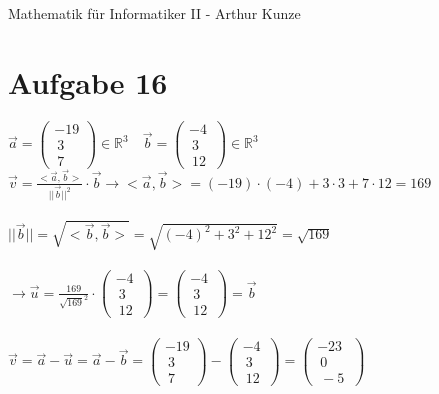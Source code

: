 \documentclass[12pt,a4paper]{article}
\begin{document}
Mathematik für Informatiker II - Arthur Kunze
\section*{Aufgabe 16}
$\vec{a} = \left( \begin{array}{c} -19 \\\ 3 \\\ 7 \ \end{array}\right)\in \mathbb{R}^3 \quad \vec{b} = \left( \begin{array}{c} -4 \\\ 3 \\\ 12 \ \end{array}\right)\in \mathbb{R}^3$\
\\
$\vec{v} = \frac{<\vec{a},\vec{b}>}{||\vec{b}||^2}\cdot \vec{b} \rightarrow <\vec{a},\vec{b}> = (-19)\cdot (-4)+3\cdot 3+7\cdot 12 = 169$\\
\\
$||\vec{b}|| =\sqrt{<\vec{b},\vec{b}>}=\sqrt{(-4)^2+3^2+12^2} = \sqrt{169}$\\
\\
$\rightarrow \vec{u}=\frac{169}{\sqrt{169}^2}\cdot \left( \begin{array}{c} -4 \\\ 3 \\\ 12 \ \end{array}\right)= \left( \begin{array}{c} -4 \\\ 3 \\\ 12 \ \end{array}\right)=\vec{b}$\\
\\
$\vec{v}= \vec{a}-\vec{u} =\vec{a} -\vec{b}= \left( \begin{array}{c} -19 \\\ 3 \\\ 7 \ \end{array}\right) - \left( \begin{array}{c} -4 \\\ 3 \\\ 12 \ \end{array}\right)= \left( \begin{array}{c} -23 \\\ 0 \\\ -5 \ \end{array}\right)$\\
\\
\end{document}
